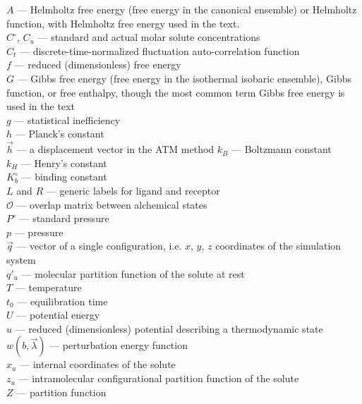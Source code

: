 \documentclass[9pt,bestpractices]{livecoms}
\begin{document}
\begin{tcolorbox}[title=List of Symbols, colback=green!10!white]
$A$ --- Helmholtz free energy (free energy in the canonical ensemble) or Helmholtz function, with Helmholtz free energy used in the text.\\
$C^{\circ}$, $C_u$ --- standard and actual molar solute concentrations \\
$C_t$ --- discrete-time-normalized fluctuation auto-correlation function\\
$f$ --- reduced (dimensionless) free energy \\
$G$ --- Gibbs free energy (free energy in the isothermal isobaric ensemble), Gibbs function, or free enthalpy, though the most common term Gibbs free energy is used in the text\\
$g$ --- statistical inefficiency\\
$h$ --- Planck's constant \\
$\vec{h}$ --- a displacement vector in the ATM method
$k_B$ --- Boltzmann constant \\
$k_H$ --- Henry's constant \\
$K_b^{\circ}$ --- binding  constant \\
$L$ and $R$ --- generic labels for ligand and receptor\\
$\mathcal{O}$ --- overlap matrix between alchemical states\\
$P^{\circ}$ --- standard pressure \\
$p$ --- pressure \\
$\vec{q}$ --- vector of a single configuration, i.e. $x$, $y$, $z$ coordinates of the simulation system\\
$q'_u$ --- molecular partition function of the solute at rest \\
$T$ --- temperature \\
$t_0$ --- equilibration time \\
$U$ --- potential energy\\
$u$ --- reduced (dimensionless) potential describing a thermodynamic state \\
$w(b, \vec{\lambda})$ --- perturbation energy function \\
$x_u$ --- internal coordinates of the solute \\
$z_u$ --- intramolecular configurational partition function of the solute \\
$Z$ --- partition function \\

\end{tcolorbox}
\end{document}
